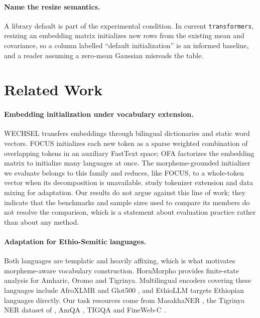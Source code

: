 \documentclass[11pt]{article}
\begin{document}
\paragraph{Name the resize semantics.} A library default is part of the
experimental condition. In current \texttt{transformers}, resizing an
embedding matrix initializes new rows from the existing mean and covariance,
so a column labelled ``default initialization'' is an informed baseline, and
a reader assuming a zero-mean Gaussian misreads the table.

\section{Related Work}

\paragraph{Embedding initialization under vocabulary extension.}
WECHSEL \citep{minixhofer-etal-2022-wechsel} transfers embeddings through
bilingual dictionaries and static word vectors. FOCUS
\citep{dobler-de-melo-2023-focus} initializes each new token as a sparse
weighted combination of overlapping tokens in an auxiliary FastText space;
OFA \citep{liu-etal-2024-ofa} factorizes the embedding matrix to initialize
many languages at once. The morpheme-grounded initializer we evaluate belongs
to this family and reduces, like FOCUS, to a whole-token vector when its
decomposition is unavailable. \citet{csaki-etal-2023-efficiently} study
tokenizer extension and data mixing for adaptation. Our results do not argue
against this line of work; they indicate that the benchmarks and sample sizes
used to compare its members do not resolve the comparison, which is a
statement about evaluation practice rather than about any method.

\paragraph{Adaptation for Ethio-Semitic languages.} Both languages are
templatic and heavily affixing, which is what motivates morpheme-aware
vocabulary construction. HornMorpho
\citep{gasser-2011-hornmorpho} provides finite-state analysis for Amharic,
Oromo and Tigrinya. Multilingual encoders covering these languages include
AfroXLMR \citep{alabi-etal-2022-adapting} and Glot500
\citep{imanigooghari-etal-2023-glot500}, and EthioLLM
\citep{tonja-etal-2024-ethiollm} targets Ethiopian languages directly. Our
task resources come from MasakhaNER
\citep{adelani-etal-2021-masakhaner}, the Tigrinya NER dataset of
\citet{yohannes-amagasa-2022-ner}, AmQA
\citep{taffa-etal-2024-amqa}, TIGQA
\citep{teklehaymanot-etal-2024-tigqa} and FineWeb-C
\citep{kydlicek-etal-2025-fineweb2}.
\end{document}
